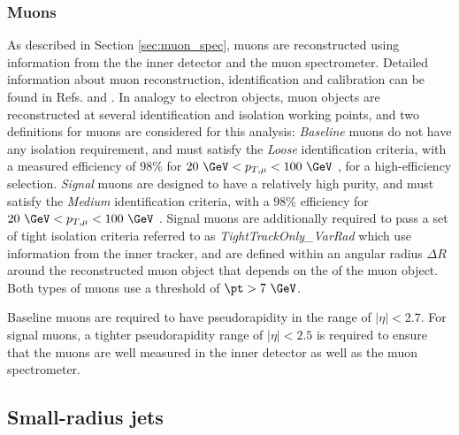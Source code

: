 \subsubsection{Muons}

As described in Section \ref{sec:muon_spec}, muons are reconstructed using information from the the inner detector and the muon spectrometer. Detailed information about muon reconstruction, identification and calibration can be found in Refs. \cite{PERF-2015-10} and \cite{ATL-PHYS-PROC-2018-052}. In analogy to electron objects, muon objects are reconstructed at several identification and isolation working points, and two definitions for muons are considered for this analysis:
\newline \emph{Baseline} muons do not have any isolation requirement, and must satisfy the \emph{Loose} identification criteria, with a measured efficiency of 98\% for \(20~\GeV<p_{T, \mu}<100~\GeV\) \cite{PERF-2015-10}, for a high-efficiency selection.
\newline \emph{Signal} muons are designed to have a relatively high purity, and must satisfy the \emph{Medium} identification criteria, with a 98\% efficiency for \(20~\GeV<p_{T, \mu}<100~\GeV\) \cite{PERF-2015-10}. Signal muons are additionally required to pass a set of tight isolation criteria referred to as \emph{TightTrackOnly\_VarRad} \cite{ATL-PHYS-PROC-2018-052} which use information from the inner tracker, and are defined within an angular radius \(\Delta R\) around the reconstructed muon object that depends on the \pt of the muon object.
\newline Both types of muons use a threshold of \(\pt > 7~\GeV \). 

Baseline muons are required to have pseudorapidity in the range of  \(|\eta| < 2.7\). For signal muons, a tighter pseudorapidity range of \(|\eta| < 2.5\) is required to ensure that the muons are well measured in the inner detector as well as the muon spectrometer. %

\subsection{Small-radius \aktfour jets}

